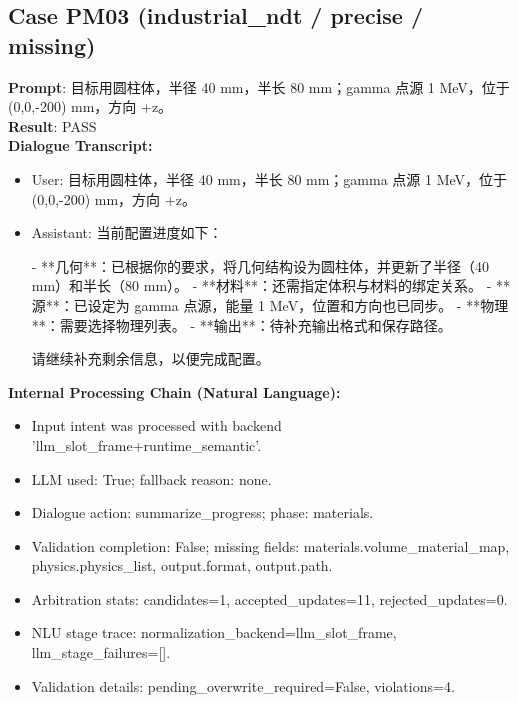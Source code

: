 \documentclass[11pt]{ctexart}
\begin{document}
\subsection{Case PM03 (industrial\_ndt / precise / missing)}
\textbf{Prompt}: 目标用圆柱体，半径 40 mm，半长 80 mm；gamma 点源 1 MeV，位于 (0,0,-200) mm，方向 +z。\\
\textbf{Result}: PASS\\
\textbf{Dialogue Transcript:}
\begin{itemize}
\item User: 目标用圆柱体，半径 40 mm，半长 80 mm；gamma 点源 1 MeV，位于 (0,0,-200) mm，方向 +z。
\item Assistant: 当前配置进度如下：

- **几何**：已根据你的要求，将几何结构设为圆柱体，并更新了半径（40 mm）和半长（80 mm）。
- **材料**：还需指定体积与材料的绑定关系。
- **源**：已设定为 gamma 点源，能量 1 MeV，位置和方向也已同步。
- **物理**：需要选择物理列表。
- **输出**：待补充输出格式和保存路径。

请继续补充剩余信息，以便完成配置。
\end{itemize}
\textbf{Internal Processing Chain (Natural Language):}
\begin{itemize}
\item Input intent was processed with backend 'llm\_slot\_frame+runtime\_semantic'.
\item LLM used: True; fallback reason: none.
\item Dialogue action: summarize\_progress; phase: materials.
\item Validation completion: False; missing fields: materials.volume\_material\_map, physics.physics\_list, output.format, output.path.
\item Arbitration stats: candidates=1, accepted\_updates=11, rejected\_updates=0.
\item NLU stage trace: normalization\_backend=llm\_slot\_frame, llm\_stage\_failures=[].
\item Validation details: pending\_overwrite\_required=False, violations=4.
\end{itemize}
\end{document}
